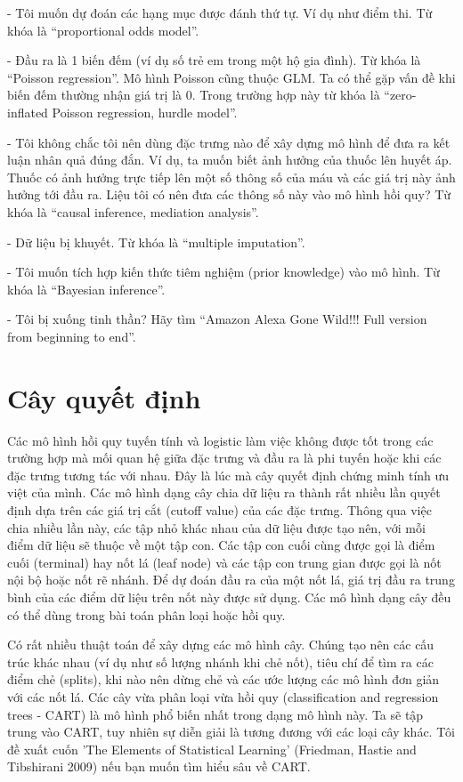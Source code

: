 - Tôi muốn dự đoán các hạng mục được đánh thứ tự. Ví dụ như điểm thi. Từ khóa là ``proportional odds model''.

- Đầu ra là 1 biến đếm (ví dụ số trẻ em trong một hộ gia đình). Từ khóa là ``Poisson regression''. Mô hình Poisson cũng thuộc GLM. Ta có thể gặp vấn đề khi biến đếm thường nhận giá trị là 0. Trong trường hợp này từ khóa là ``zero-inflated Poisson regression, hurdle model''.

- Tôi không chắc tôi nên dùng đặc trưng nào để xây dựng mô hình để đưa ra kết luận nhân quả đúng đắn. Ví dụ, ta muốn biết ảnh hưởng của thuốc lên huyết áp. Thuốc có ảnh hưởng trực tiếp lên một số thông số của máu và các giá trị này ảnh hưởng tới đầu ra. Liệu tôi có nên đưa các thông số này vào mô hình hồi quy? Từ khóa là ``causal inference, mediation analysis''.

- Dữ liệu bị khuyết. Từ khóa là ``multiple imputation''.

- Tôi muốn tích hợp kiến thức tiêm nghiệm (prior knowledge) vào mô hình. Từ khóa là ``Bayesian inference''.

- Tôi bị xuống tinh thần? Hãy tìm ``Amazon Alexa Gone Wild!!! Full version from beginning to end''. 

\section{Cây quyết định}

Các mô hình hồi quy tuyến tính và logistic làm việc không được tốt trong các trường hợp mà mối quan hệ giữa đặc trưng và đầu ra là phi tuyến hoặc khi các đặc trưng tương tác với nhau. Đây là lúc mà cây quyết định chứng minh tính ưu việt của mình. Các mô hình dạng cây chia dữ liệu ra thành rất nhiều lần quyết định dựa trên các giá trị cắt (cutoff value) của các đặc trưng. Thông qua việc chia nhiều lần này, các tập nhỏ khác nhau của dữ liệu được tạo nên, với mỗi điểm dữ liệu sẽ thuộc về một tập con. Các tập con cuối cùng được gọi là điểm cuối (terminal) hay nốt lá (leaf node) và các tập con trung gian được gọi là nốt nội bộ hoặc nốt rẽ nhánh. Để dự đoán đầu ra của một nốt lá, giá trị đầu ra trung bình của các điểm dữ liệu trên nốt này được sử dụng. Các mô hình dạng cây đều có thể dùng trong bài toán phân loại hoặc hồi quy.

Có rất nhiều thuật toán để xây dựng các mô hình cây. Chúng tạo nên các cấu trúc khác nhau (ví dụ như số lượng nhánh khi chẻ nốt), tiêu chí để tìm ra các điểm chẻ (splits), khi nào nên dừng chẻ và các ước lượng các mô hình đơn giản với các nốt lá. Các cây vừa phân loại vừa hồi quy (classification and regression trees - CART) là mô hình phổ biến nhất trong dạng mô hình này. Ta sẽ tập trung vào CART, tuy nhiên sự diễn giải là tương đương với các loại cây khác. Tôi đề xuất cuốn 'The Elements of Statistical Learning' (Friedman, Hastie and Tibshirani 2009) nếu bạn muốn tìm hiểu sâu về CART.

